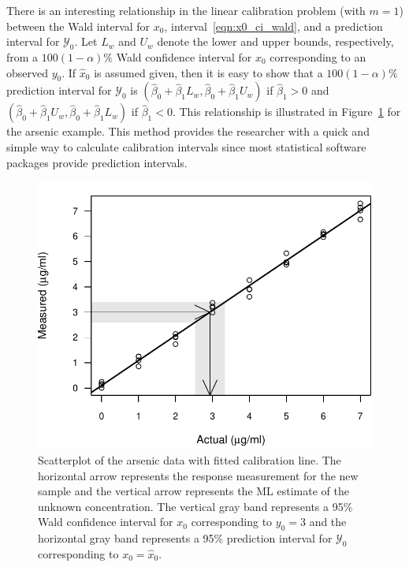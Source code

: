 \documentclass[cmfont,usenames,dvipsnames,leqno]{afit-etd}\usepackage[]{graphicx}\usepackage[]{color}
\makeatletter
\def\maxwidth{ %
  \ifdim\Gin@nat@width>\linewidth
    \linewidth
  \else
    \Gin@nat@width
  \fi
}
\newenvironment{knitrout}{}{} %
\renewenvironment{knitrout}{\begin{singlespace}}{\end{singlespace}}
\newcommand{\mc}[1]{\ensuremath{\mathcal{#1}}}
\newcommand{\wh}[1]{\ensuremath{\widehat{#1}}}
\makeatother
\begin{document}
There is an interesting relationship in the linear calibration problem (with $m = 1$) between the Wald interval for $x_0$, interval~\eqref{eqn:x0_ci_wald}, and a prediction interval for $\mc{Y}_0$. Let $L_w$ and $U_w$ denote the lower and upper bounds, respectively, from a $100(1 - \alpha)\%$ Wald confidence interval for $x_0$ corresponding to an observed $y_0$. If $\wh{x}_0$ is assumed given, then it is easy to show that a $100(1 - \alpha)\%$ prediction interval for $\mc{Y}_0$ is $(\wh{\beta}_0+\wh{\beta}_1 L_w, \wh{\beta}_0+\wh{\beta}_1 U_w)$ if $\wh{\beta}_1 > 0$ and $(\wh{\beta}_0+\wh{\beta}_1 U_w, \wh{\beta}_0+\wh{\beta}_1 L_w)$ if $\wh{\beta}_1 < 0$. This relationship is illustrated in Figure~\ref{fig:arsenic-wald} for the arsenic example. This method provides the researcher with a quick and simple way to calculate calibration intervals since most statistical software packages provide prediction intervals.

\begin{knitrout}
\color{fgcolor}\begin{figure}[H]

\includegraphics[width=\maxwidth]{figure/arsenic-wald} \caption[Relationship beween Wald interval for $x_0$ and prediction interval for $\mc{Y}_0$]{Scatterplot of the arsenic data with fitted calibration line. The horizontal arrow represents the response measurement for the new sample and the vertical arrow represents the ML estimate of the unknown concentration. The vertical gray band represents a 95\% Wald confidence interval for $x_0$ corresponding to $y_0 = 3$ and the horizontal gray band represents a 95\% prediction interval for $\mc{Y}_0$ corresponding to $x_0 = \wh{x}_0$.\label{fig:arsenic-wald}}
\end{figure}


\end{knitrout}
\end{document}
